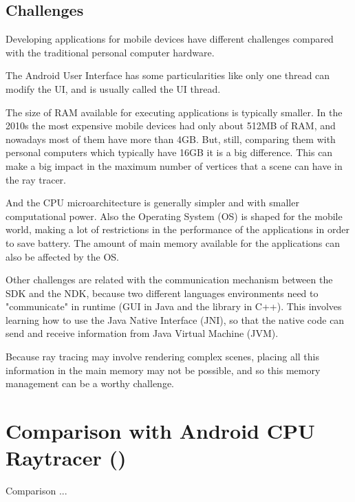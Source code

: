 \subsection{Challenges}

\par
Developing applications for mobile devices have different challenges compared with the traditional personal computer hardware.

\par
The Android User Interface has some particularities like only one thread can modify the UI, and is usually called the UI thread.

\par
The size of RAM available for executing applications is typically smaller.
In the 2010s the most expensive mobile devices had only about 512MB of RAM, and nowadays most of them have more than 4GB.
But, still, comparing them with personal computers which typically have 16GB it is a big difference.
This can make a big impact in the maximum number of vertices that a scene can have in the ray tracer.

\par
And the CPU microarchitecture is generally simpler and with smaller computational power.
Also the Operating System (OS) is shaped for the mobile world, making a lot of restrictions in the performance of the applications in order to save battery.
The amount of main memory available for the applications can also be affected by the OS.

\par
Other challenges are related with the communication mechanism between the SDK and the NDK, because two different languages environments need to "communicate" in runtime (GUI in Java and the library in C++).
This involves learning how to use the Java Native Interface (JNI), so that the native code can send and receive information from Java Virtual Machine (JVM).

\par
Because ray tracing may involve rendering complex scenes, placing all this information in the main memory may not be possible, and so this memory management can be a worthy challenge.

\section{Comparison with Android CPU Raytracer (\cite{Android_CPU_Raytracer})}

\par
Comparison ...